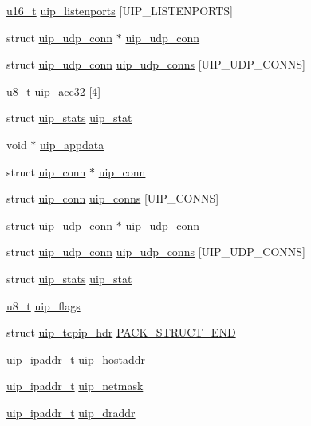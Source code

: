 \begin{DoxyCompactItemize}
\hyperlink{group__uipfw_ga77570ac4fcab86864fa1916e55676da2}{u16\_\-t} \hyperlink{group__uip_ga236d5c7872f59c8fe7b701c7252b976e}{uip\_\-listenports} \mbox{[}UIP\_\-LISTENPORTS\mbox{]}
\item 
struct \hyperlink{structuip__udp__conn}{uip\_\-udp\_\-conn} $\ast$ \hyperlink{group__uip_ga210f227119fc972e6222c9cb452e15a9}{uip\_\-udp\_\-conn}
\item 
struct \hyperlink{structuip__udp__conn}{uip\_\-udp\_\-conn} \hyperlink{group__uip_gaeb533744817cf6695d75293369c2248b}{uip\_\-udp\_\-conns} \mbox{[}UIP\_\-UDP\_\-CONNS\mbox{]}
\item 
\hyperlink{group__uipfw_ga4caecabca98b43919dd11be1c0d4cd8e}{u8\_\-t} \hyperlink{group__uip_ga2a0cf5d86c58fab216414ce59bf1fea1}{uip\_\-acc32} \mbox{[}4\mbox{]}
\item 
struct \hyperlink{structuip__stats}{uip\_\-stats} \hyperlink{group__uip_ga9ee50a40597e67fce96541ab56c3b712}{uip\_\-stat}
\item 
void $\ast$ \hyperlink{group__uip_ga561b8eda32e059d4e7397f776268cc63}{uip\_\-appdata}
\item 
struct \hyperlink{structuip__conn}{uip\_\-conn} $\ast$ \hyperlink{group__uip_ga788ffac72342f6172343d7f8099cbe1a}{uip\_\-conn}
\item 
struct \hyperlink{structuip__conn}{uip\_\-conn} \hyperlink{group__uip_gaf703683056d2bfa5c81fa157dcb20fe2}{uip\_\-conns} \mbox{[}UIP\_\-CONNS\mbox{]}
\item 
struct \hyperlink{structuip__udp__conn}{uip\_\-udp\_\-conn} $\ast$ \hyperlink{group__uip_ga210f227119fc972e6222c9cb452e15a9}{uip\_\-udp\_\-conn}
\item 
struct \hyperlink{structuip__udp__conn}{uip\_\-udp\_\-conn} \hyperlink{group__uip_gaeb533744817cf6695d75293369c2248b}{uip\_\-udp\_\-conns} \mbox{[}UIP\_\-UDP\_\-CONNS\mbox{]}
\item 
struct \hyperlink{structuip__stats}{uip\_\-stats} \hyperlink{group__uip_ga9ee50a40597e67fce96541ab56c3b712}{uip\_\-stat}
\item 
\hyperlink{group__uipfw_ga4caecabca98b43919dd11be1c0d4cd8e}{u8\_\-t} \hyperlink{group__uip_gab4ef6b00924990e7a293f66715b6d1d1}{uip\_\-flags}
\item 
struct \hyperlink{structuip__tcpip__hdr}{uip\_\-tcpip\_\-hdr} \hyperlink{group__uip_ga2bd9dfb47fe5347b46dab0c6b93f9b4e}{PACK\_\-STRUCT\_\-END}
\item 
\hyperlink{group__uip_ga1ef35301f43a5bbb9f89f07b5a36b9a0}{uip\_\-ipaddr\_\-t} \hyperlink{group__uip_ga7d3673f52f5846b6961d23b150decd54}{uip\_\-hostaddr}
\item 
\hyperlink{group__uip_ga1ef35301f43a5bbb9f89f07b5a36b9a0}{uip\_\-ipaddr\_\-t} \hyperlink{group__uip_ga3237be0d9ec457de0177689ee23c0d5c}{uip\_\-netmask}
\item 
\hyperlink{group__uip_ga1ef35301f43a5bbb9f89f07b5a36b9a0}{uip\_\-ipaddr\_\-t} \hyperlink{group__uip_ga20df5c82f2a15a508c19e505b5d9de2b}{uip\_\-draddr}
\end{DoxyCompactItemize}


